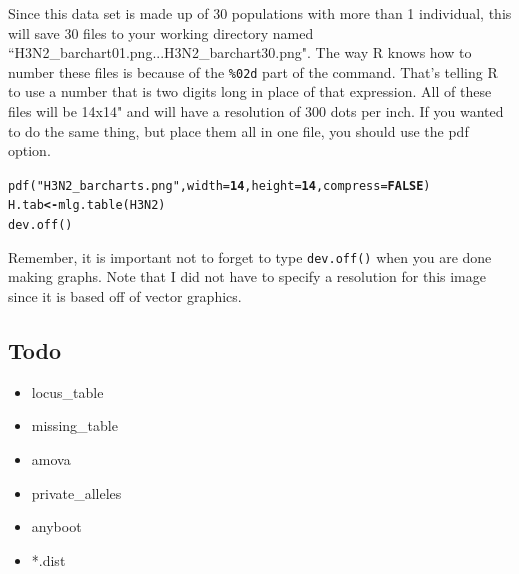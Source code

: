 \documentclass[letterpaper]{article}\usepackage[]{graphicx}\usepackage[]{color}
\makeatletter
\newcommand{\hlnum}[1]{\textcolor[rgb]{0.502,0,0.502}{\textbf{#1}}}%
\newcommand{\hlstr}[1]{\textcolor[rgb]{0.651,0.522,0}{#1}}%
\newcommand{\hlstd}[1]{\textcolor[rgb]{0,0,0}{#1}}%
\newcommand{\hlkwb}[1]{\textcolor[rgb]{0.502,0.502,0.753}{\textbf{#1}}}%
\newcommand{\hlkwc}[1]{\textcolor[rgb]{0,0.502,0.753}{#1}}%
\newcommand{\hlkwd}[1]{\textcolor[rgb]{0,0.267,0.4}{#1}}%
\newenvironment{kframe}{%
 \def\at@end@of@kframe{}%
 \ifinner\ifhmode%
  \def\at@end@of@kframe{\end{minipage}}%
  \begin{minipage}{\columnwidth}%
 \fi\fi%
 \def\FrameCommand##1{\hskip\@totalleftmargin \hskip-\fboxsep
 \colorbox{shadecolor}{##1}\hskip-\fboxsep
     \hskip-\linewidth \hskip-\@totalleftmargin \hskip\columnwidth}%
 \MakeFramed {\advance\hsize-\width
   \@totalleftmargin\z@ \linewidth\hsize
   \@setminipage}}%
 {\par\unskip\endMakeFramed%
 \at@end@of@kframe}
\newenvironment{knitrout}{}{} %
\makeatother
\begin{document}
Since this data set is made up of 30 populations with more than 1 individual, this will save 30 files to your working directory named ``H3N2\_barchart01.png...H3N2\_barchart30.png". The way R knows how to number these files is because of the \texttt{\%02d} part of the command. That's telling R to use a number that is two digits long in place of that expression. All of these files will be 14x14" and will have a resolution of 300 dots per inch. If you wanted to do the same thing, but place them all in one file, you should use the pdf option.

\begin{knitrout}\footnotesize
{}\color{fgcolor}\begin{kframe}
\begin{alltt}
\hlkwd{pdf}\hlstd{(}\hlstr{"H3N2_barcharts.png"}\hlstd{,} \hlkwc{width} \hlstd{=} \hlnum{14}\hlstd{,} \hlkwc{height} \hlstd{=} \hlnum{14}\hlstd{,} \hlkwc{compress} \hlstd{=} \hlnum{FALSE}\hlstd{)}
\hlstd{H.tab} \hlkwb{<-} \hlkwd{mlg.table}\hlstd{(H3N2)}
\hlkwd{dev.off}\hlstd{()}
\end{alltt}
\end{kframe}
\end{knitrout}


Remember, it is important not to forget to type \texttt{dev.off()} when you are done making graphs. Note that I did not have to specify a resolution for this image since it is based off of vector graphics.

%
\subsection{Todo}

\begin{itemize}
  \item locus\_table
  \item missing\_table
  \item amova
  \item private\_alleles
  \item anyboot
  \item *.dist
\end{itemize}

%
\end{document}
